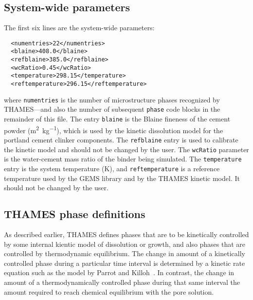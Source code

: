 \documentclass{article}
\begin{document}
\subsection{System-wide parameters}
The first six lines are the system-wide parameters:
\begin{lstlisting}
  <numentries>22</numentries>
  <blaine>408.0</blaine>
  <refblaine>385.0</refblaine>
  <wcRatio>0.45</wcRatio>
  <temperature>298.15</temperature>
  <reftemperature>296.15</reftemperature>
 \end{lstlisting}
 where \texttt{numentries} is the number of microstructure phases recognized by
 THAMES---and also the number of subsequent \texttt{phase} code blocks in the
 remainder of this file.  The entry \texttt{blaine} is the Blaine fineness of
 the cement powder (\si{\meter\squared\per\kilo\gram}), which is used by the
 kinetic dissolution model for the portland cement clinker components.  The
 \texttt{refblaine} entry is used to calibrate the kinetic model and
 should not be changed by the user.  The \texttt{wcRatio} parameter is the water-cement
 mass ratio of the binder being simulated.  The \texttt{temperature} entry is
 the system temperature (\si{\kelvin}), and \texttt{reftemperature} is a
 reference temperature used by the GEMS library and by the THAMES kinetic model.
 It should not be changed by the user.

 \subsection{THAMES phase definitions}
 As described earlier, THAMES defines phases that are to be kinetically
 controlled by some internal kientic model of dissolution or growth, and also
 phases that are controlled by thermodynamic equilibrium.  The change in amount
 of a kinetically controlled phase during a particular time interval is
 determined by a kinetic rate equation such as the model by Parrot and
 Killoh~\cite{Parrot84,Lothenbach06}.  In contrast, the change in amount
 of a thermodynamically controlled phase during that same interval the amount
 required to reach chemical equilibrium with the pore solution.
\end{document}

